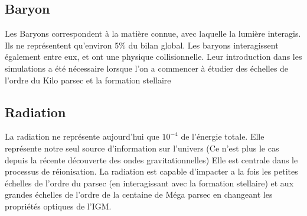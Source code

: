 %
%

\subsection{Baryon}

Les Baryons correspondent à la matière connue, avec laquelle la lumière interagis.
Ils ne représentent qu'environ 5\% du bilan global.
Les baryons interagissent également entre eux, et ont une physique collisionnelle.
Leur introduction dans les simulations a été nécessaire lorsque l'on a commencer à étudier des échelles de l'ordre du Kilo parsec et la formation stellaire


\subsection{Radiation}

La radiation ne représente aujourd'hui que $10^{-4}$ de l'énergie totale.
Elle représente notre seul source d'information sur l'univers (Ce n'est plus le cas depuis la récente découverte des ondes gravitationnelles) %
Elle est centrale dans le processus de réionisation.
La radiation est capable d'impacter a la fois les petites échelles de l'ordre du parsec (en interagissant avec la formation stellaire)
et aux grandes échelles de l'ordre de la centaine de Méga parsec en changeant les propriétés optiques de l'\ac{IGM}.




%

